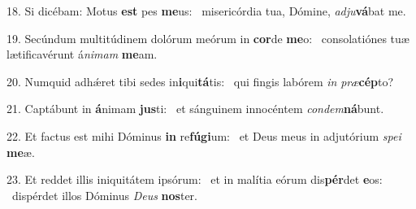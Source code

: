 18. Si dicébam: Motus \textbf{est} pes \textbf{me}us: \ast\  misericórdia tua, Dómine, \textit{ad}\textit{ju}\textbf{vá}bat me.\

19. Secúndum multitúdinem dolórum meórum in \textbf{cor}de \textbf{me}o: \ast\  consolatiónes tuæ lætificavérunt á\textit{ni}\textit{mam} \textbf{me}am.\

20. Numquid adhǽret tibi sedes in\textbf{i}qui\textbf{tá}tis: \ast\  qui fingis labórem \textit{in} \textit{præ}\textbf{cép}to?\

21. Captábunt in \textbf{á}nimam \textbf{jus}ti: \ast\  et sánguinem innocéntem \textit{con}\textit{dem}\textbf{ná}bunt.\

22. Et factus est mihi Dóminus \textbf{in} re\textbf{fú}\textbf{gi}um: \ast\  et Deus meus in adjutórium \textit{spe}\textit{i} \textbf{me}æ.\

23. Et reddet illis iniquitátem ipsórum: \dag\  et in malítia eórum dis\textbf{pér}det \textbf{e}os: \ast\  dispérdet illos Dóminus \textit{De}\textit{us} \textbf{nos}ter.\

